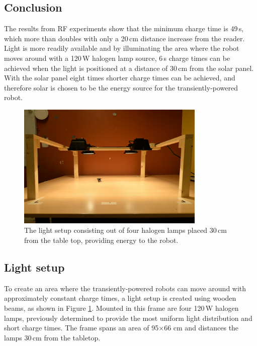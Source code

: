 \subsection{Conclusion}

The results from RF experiments show that the minimum charge time is 49\,s, which more than doubles with only a 20\,cm distance increase from the reader.
Light is more readily available and by illuminating the area where the robot moves around with a 120\,W halogen lamp source, 6\,s charge times can be achieved when the light is positioned at a distance of 30\,cm from the solar panel.
With the solar panel eight times shorter charge times can be achieved, and therefore solar is chosen to be the energy source for the transiently-powered robot.

\begin{figure}[!ht]
	\centering
	\includegraphics[width=0.8\textwidth]{pics/light_setup.jpg}
	\caption{The light setup consisting out of four halogen lamps placed 30\,cm from the table top, providing energy to the robot.}
	\label{fig:light_setup}
\end{figure}

\subsection{Light setup}

To create an area where the transiently-powered robots can move around with approximately constant charge times, a light setup is created using wooden beams, as shown in Figure \ref{fig:light_setup}.
Mounted in this frame are four 120\,W halogen lamps, previously determined to provide the most uniform light distribution and short charge times.
The frame spans an area of 95$\times$66 cm and distances the lamps 30\,cm from the tabletop.

